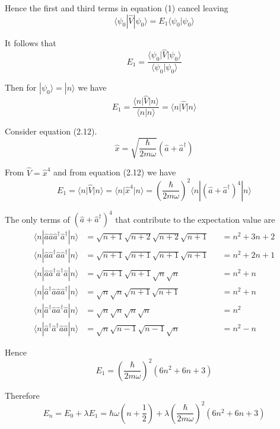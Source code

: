 \documentclass[12pt]{article}
\begin{document}
Hence the first and third terms in equation (1) cancel leaving
\begin{equation*}
\langle\psi_0|\hat V|\psi_0\rangle
=E_1\langle\psi_0|\psi_0\rangle
\end{equation*}

It follows that
\begin{equation*}
E_1=\frac{\langle\psi_0\vert\hat V\vert\psi_0\rangle}{\langle\psi_0\vert\psi_0\rangle}
\end{equation*}

Then for $|\psi_0\rangle=|n\rangle$ we have
\begin{equation*}
E_1=\frac{\langle n\vert\hat V\vert n\rangle}{\langle n\vert n\rangle}
=\langle n\vert\hat V\vert n\rangle
\end{equation*}

Consider equation (2.12).
\begin{equation*}
\hat x=\sqrt{\frac{\hbar}{2m\omega}}\left(\hat a+\hat a^\dag\right)
\tag{2.12}
\end{equation*}

From $\hat V=\hat x^4$ and from equation (2.12) we have
\begin{equation*}
E_1=\langle n\vert\hat V\vert n\rangle
=\langle n\vert\hat x^4\vert n\rangle
=\left(\frac{\hbar}{2m\omega}\right)^2
\langle n|\left(\hat a+\hat a^\dag\right)^4|n\rangle
\end{equation*}

The only terms of $(\hat a+\hat a^\dag)^4$ that contribute to the expectation value are
\begin{align*}
\langle n|\hat a\hat a\hat a^\dag\hat a^\dag|n\rangle
&=\sqrt{n+1}\sqrt{n+2}\sqrt{n+2}\sqrt{n+1}
& {}&=n^2+3n+2
\\
\langle n|\hat a\hat a^\dag\hat a\hat a^\dag|n\rangle
&=\sqrt{n+1}\sqrt{n+1}\sqrt{n+1}\sqrt{n+1}
& {}&=n^2+2n+1
\\
\langle n|\hat a\hat a^\dag\hat a^\dag\hat a|n\rangle
&=\sqrt{n + 1}\sqrt{n + 1}\sqrt{n}\sqrt{n}
& {}&=n^2+n
\\
\langle n|\hat a^\dag\hat a\hat a\hat a^\dag|n\rangle
&=\sqrt{n}\sqrt{n}\sqrt{n+1}\sqrt{n+1}
& {}&=n^2+n
\\
\langle n|\hat a^\dag\hat a\hat a^\dag\hat a|n\rangle
&=\sqrt{n}\sqrt{n}\sqrt{n}\sqrt{n}
& {}&=n^2
\\
\langle n|\hat a^\dag\hat a^\dag\hat a\hat a|n\rangle
&=\sqrt{n}\sqrt{n-1}\sqrt{n-1}\sqrt{n}
& {}&=n^2-n
\end{align*}

Hence
\begin{equation*}
E_1=\left(\frac{\hbar}{2m\omega}\right)^2\left(6n^2+6n+3\right)
\end{equation*}

Therefore
\begin{equation*}
E_n=E_0+\lambda E_1=\hbar\omega\left(n+\frac{1}{2}\right)
+\lambda\left(\frac{\hbar}{2m\omega}\right)^2\left(6n^2+6n+3\right)
\end{equation*}
\end{document}

